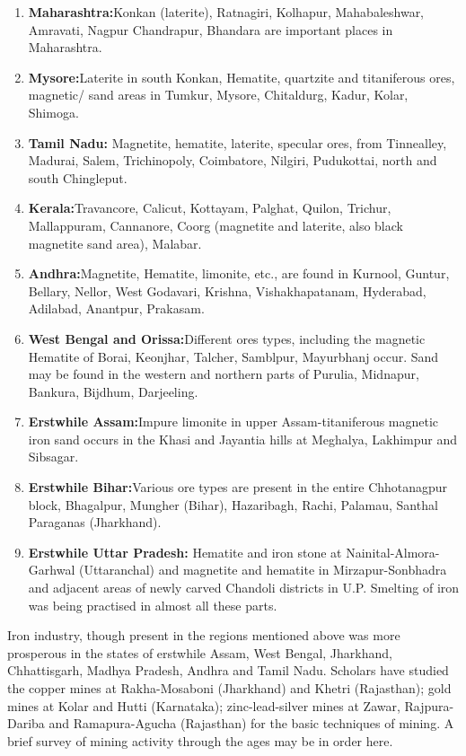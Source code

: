 \begin{enumerate}
 \item \textbf{Maharashtra:}Konkan (laterite), Ratnagiri, Kolhapur, Mahabaleshwar, Amravati, Nagpur Chandrapur, Bhandara are important places in Maharashtra.

 \item \textbf{Mysore:}Laterite in south Konkan, Hematite, quartzite and titaniferous ores, magnetic/ sand areas in Tumkur, Mysore, Chitaldurg, Kadur, Kolar, Shimoga.

 \item \textbf{Tamil Nadu:} Magnetite, hematite, laterite, specular ores, from Tinnealley, Madurai, Salem, Trichinopoly, Coimbatore, Nilgiri, Pudukottai, north and south Chingleput.

 \item \textbf{Kerala:}Travancore, Calicut, Kottayam, Palghat, Quilon, Trichur, Mallappuram, Cannanore, Coorg (magnetite and laterite, also black magnetite sand area), Malabar.

 \item \textbf{Andhra:}Magnetite, Hematite, limonite, etc., are found in Kurnool, Guntur, Bellary, Nellor, West Godavari, Krishna, Vishakhapatanam, Hyderabad, Adilabad, Anantpur, Prakasam.

 \item \textbf{West Bengal and Orissa:}Different ores types, including the magnetic Hematite of Borai, Keonjhar, Talcher, Samblpur, Mayurbhanj occur. Sand may be found in the western and northern parts of Purulia, Midnapur, Bankura, Bijdhum, Darjeeling.

 \item \textbf{Erstwhile Assam:}Impure limonite in upper Assam-titaniferous magnetic iron sand occurs in the Khasi and Jayantia hills at Meghalya, Lakhimpur and Sibsagar.

 \item \textbf{}\textbf{Erstwhile Bihar:}Various ore types are present in the entire Chhotanagpur block, Bhagalpur, Mungher (Bihar), Hazaribagh, Rachi, Palamau, Santhal Paraganas (Jharkhand).

 \item \textbf{Erstwhile Uttar Pradesh:} Hematite and iron stone at Nainital-Almora-Garhwal (Uttaranchal) and magnetite and hematite in Mirzapur-Sonbhadra and adjacent areas of newly carved Chandoli districts in U.P. Smelting of iron was being practised in almost all these parts.

\end{enumerate}

Iron industry, though present in the regions mentioned above was more prosperous in the states of erstwhile Assam, West Bengal, Jharkhand, Chhattisgarh, Madhya Pradesh, Andhra and Tamil Nadu. Scholars have studied the copper mines at Rakha-Mosaboni (Jharkhand) and Khetri (Rajasthan); gold mines at Kolar and Hutti (Karnataka); zinc-lead-silver mines at Zawar, Rajpura-Dariba and Ramapura-Agucha (Rajasthan) for the basic techniques of mining. A brief survey of mining activity through the ages may be in order here.

